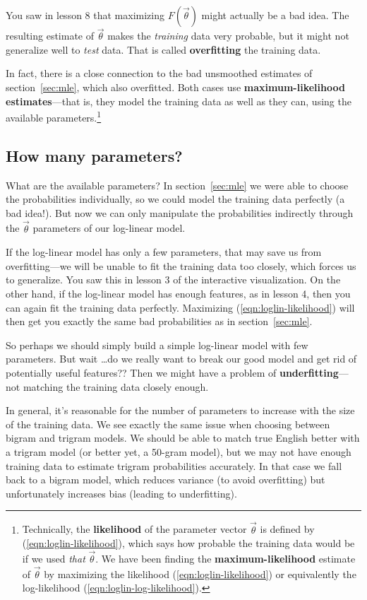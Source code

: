 \documentclass[11pt]{article}
\newcommand{\vtheta}{\vec{\theta}}
\begin{document}
You saw in lesson 8 that maximizing $F(\vtheta)$ might actually be a
bad idea.  The resulting estimate of $\vtheta$ makes the {\em
  training} data very probable, but it might not generalize well to
{\em test} data.  That is called {\bf overfitting} the training data.

In fact, there is a close connection to the bad unsmoothed estimates
of section~\ref{sec:mle}, which also overfitted.  Both cases use {\bf
  maximum-likelihood estimates}---that is, they model the training
data as well as they can, using the available
parameters.\footnote{Technically, the {\bf likelihood} of the
  parameter vector $\vtheta$ is defined by
  (\ref{eqn:loglin-likelihood}), which says how probable the training
  data would be if we used {\em that} $\vtheta$.  We have been finding
  the {\bf maximum-likelihood} estimate of $\vtheta$ by maximizing the
  likelihood (\ref{eqn:loglin-likelihood}) or equivalently the
  log-likelihood (\ref{eqn:loglin-log-likelihood}).}

\subsection{How many parameters?}

What are the available parameters?  In section~\ref{sec:mle} we were
able to choose the probabilities individually, so we could model the
training data perfectly (a bad idea!).  But now we can only manipulate
the probabilities indirectly through the $\vtheta$ parameters of our
log-linear model.

If the log-linear model has only a few parameters, that may save us
from overfitting---we will be unable to fit the training data too
closely, which forces us to generalize.  You saw this in lesson 3 of
the interactive visualization.  On the other hand, if the log-linear
model has enough features, as in lesson 4, then you can again fit the
training data perfectly.  Maximizing (\ref{eqn:loglin-likelihood})
will then get you exactly the same bad probabilities as in
section~\ref{sec:mle}.

So perhaps we should simply build a simple log-linear model with few
parameters.  But wait \ldots do we really want to break our good model
and get rid of potentially useful features??  Then we might have a
problem of {\bf underfitting}---not matching the training data closely
enough.

In general, it's reasonable for the number of parameters to increase
with the size of the training data.  We see exactly the same issue
when choosing between bigram and trigram models.  We should be able to
match true English better with a trigram model (or better yet, a
50-gram model), but we may not have enough training data to estimate
trigram probabilities accurately.  In that case we fall back to a
bigram model, which reduces variance (to avoid overfitting) but
unfortunately increases bias (leading to underfitting).
\end{document}
